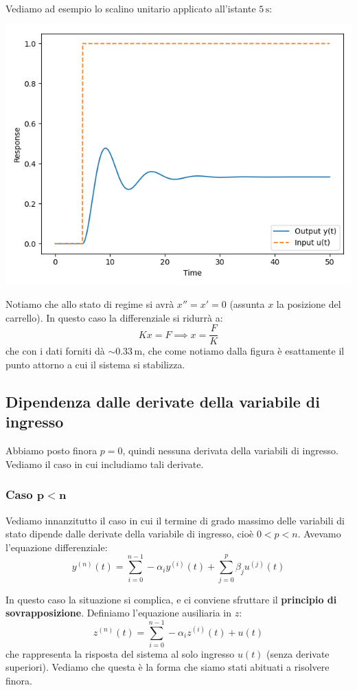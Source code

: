 \documentclass[a4paper,11pt]{article}
\begin{document}
Vediamo ad esempio lo scalino unitario applicato all'istante $5 \, \mathrm{s}$:
\begin{center}
\includegraphics[scale=0.8]{../figures/mass-spring-damper-response.png}
\end{center}

Notiamo che allo stato di regime si avrà $x'' = x' = 0$ (assunta $x$ la posizione del carrello).
In questo caso la differenziale si ridurrà a:
$$
Kx = F \implies x = \frac{F}{K}
$$
che con i dati forniti dà $\sim 0.33 \, \mathrm{m}$, che come notiamo dalla figura è esattamente il punto attorno a cui il sistema si stabilizza.

\subsection{Dipendenza dalle derivate della variabile di ingresso}
Abbiamo posto finora $p = 0$, quindi nessuna derivata della variabili di ingresso.
Vediamo il caso in cui includiamo tali derivate.

\subsubsection{Caso $\mathbf{p < n}$}
Vediamo innanzitutto il caso in cui il termine di grado massimo delle variabili di stato dipende dalle derivate della variabile di ingresso, cioè $0 < p < n$.
Avevamo l'equazione differenziale:
$$
y^{(n)} (t) = \sum_{i=0}^{n-1} - \alpha_i y^{(i)}(t) + \sum_{j=0}^p \beta_j u^{(j)}(t)
$$

In questo caso la situazione si complica, e ci conviene sfruttare il \textbf{principio di sovrapposizione}.
Definiamo l'equazione ausiliaria in $z$:
$$
z^{(n)}(t) = \sum_{i = 0}^{n - 1} -\alpha_i z^{(i)}(t) + u(t)
$$
che rappresenta la risposta del sistema al solo ingresso $u(t)$ (senza derivate superiori).
Vediamo che questa è la forma che siamo stati abituati a risolvere finora.
\end{document}
